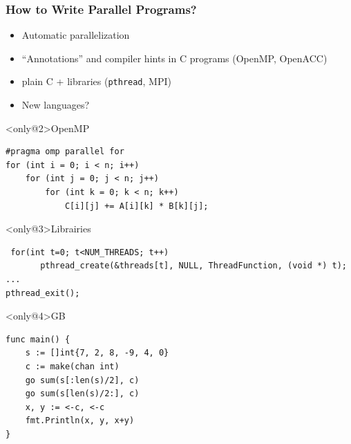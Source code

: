 \documentclass[xcolor={x11names,svgnames,psnames}]{beamer}
\newcommand{\red}{\alert}
\begin{document}
\begin{frame}[fragile]
  \frametitle{How to Write Parallel Programs?}

  \begin{itemize}
  \item<1-> Automatic parallelization
  \item<2-> ``Annotations'' and compiler hints in C programs  (\red{OpenMP}, OpenACC)
  \item<3-> plain C + libraries (\texttt{pthread}, \red{MPI})
  \item<4-> New languages?
  \end{itemize}

  \medskip

  \begin{overlayarea}{\textwidth}{5cm}
  \begin{block}<only@2>{OpenMP}
\begin{verbatim}
#pragma omp parallel for
for (int i = 0; i < n; i++)
    for (int j = 0; j < n; j++)
        for (int k = 0; k < n; k++)
            C[i][j] += A[i][k] * B[k][j];
\end{verbatim}
  \end{block}


  \begin{block}<only@3>{Librairies}
\begin{verbatim}
 for(int t=0; t<NUM_THREADS; t++)
       pthread_create(&threads[t], NULL, ThreadFunction, (void *) t);
...
pthread_exit();
\end{verbatim}
  \end{block}

  \begin{block}<only@4>{GB}
\begin{verbatim}
func main() {
    s := []int{7, 2, 8, -9, 4, 0}
    c := make(chan int)
    go sum(s[:len(s)/2], c)
    go sum(s[len(s)/2:], c)
    x, y := <-c, <-c
    fmt.Println(x, y, x+y)
}
\end{verbatim}
  \end{block}
\end{overlayarea}
\end{frame}


\end{document}
